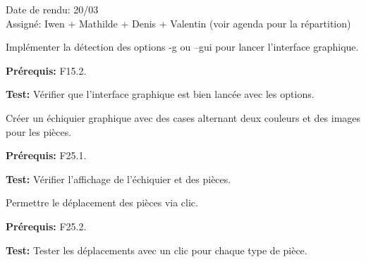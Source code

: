 \documentclass{article}
\begin{document}
\begin{needbox}
    \begin{duedatebox}
        Date de rendu: 20/03\\
        Assigné: Iwen + Mathilde + Denis + Valentin (voir agenda pour la répartition)
    \end{duedatebox}
    \begin{subneedbox}
        Implémenter la détection des options -g ou --gui pour lancer l'interface graphique.

        \textbf{Prérequis:} F15.2.

        \textbf{Test:} Vérifier que l'interface graphique est bien lancée avec les options.
    \end{subneedbox}
    
    \begin{subneedbox}
        Créer un échiquier graphique avec des cases alternant deux couleurs et des images pour les pièces.

        \textbf{Prérequis:} F25.1.

        \textbf{Test:} Vérifier l'affichage de l'échiquier et des pièces.
    \end{subneedbox}
    
    \begin{subneedbox}
        Permettre le déplacement des pièces via clic.

        \textbf{Prérequis:} F25.2.

        \textbf{Test:} Tester les déplacements avec un clic pour chaque type de pièce.
    \end{subneedbox}
\end{needbox}
\end{document}
